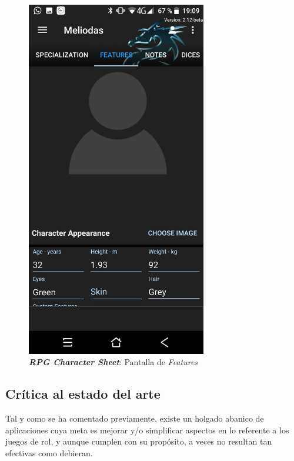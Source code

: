 \begin{figure}[H]
\begin{minipage}{0.3\textwidth}
    \end{minipage} \hspace{2cm}
    \begin{minipage}{0.3\textwidth}
        \centering
        \includegraphics[width=0.7\textwidth]{Images/RPG_Character_Sheet_2.jpeg}
        \caption{\textit{\textbf{RPG Character Sheet}}: Pantalla de 
        \textit{Features}}
        
    \end{minipage}
\end{figure}


\subsection{Crítica al estado del arte}
Tal y como se ha comentado previamente, existe un holgado abanico de 
aplicaciones cuya meta es mejorar y/o simplificar aspectos en lo referente a 
los juegos de rol, y aunque cumplen con su propósito, a veces no resultan 
tan efectivas como debieran. 
\medskip 

